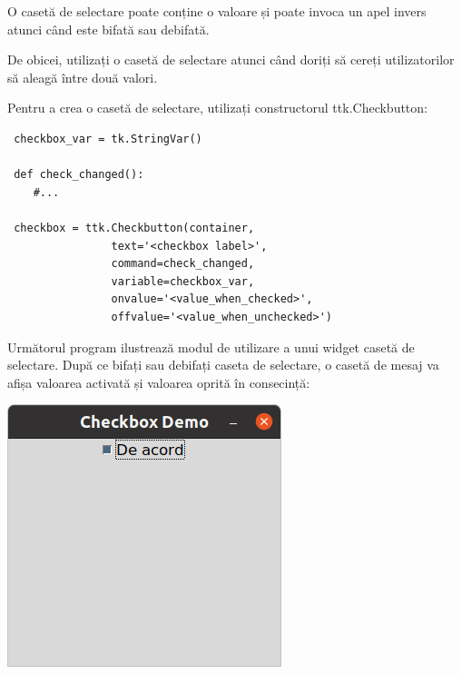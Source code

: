 \documentclass[12pt,a4paper]{book}
\begin{document}
 O casetă de selectare poate conține o valoare și poate invoca un apel invers atunci când este bifată sau debifată.

 De obicei, utilizați o casetă de selectare atunci când doriți să cereți utilizatorilor să aleagă între două valori.

 Pentru a crea o casetă de selectare, utilizați constructorul ttk.Checkbutton:
 
\begin{verbatim}
 checkbox_var = tk.StringVar()

 def check_changed():
    #...

 checkbox = ttk.Checkbutton(container,
                text='<checkbox label>',
                command=check_changed,
                variable=checkbox_var,
                onvalue='<value_when_checked>',
                offvalue='<value_when_unchecked>')
\end{verbatim}
Următorul program ilustrează modul de utilizare a unui widget casetă de selectare.  După ce bifați sau debifați caseta de selectare, o casetă de mesaj va afișa valoarea activată și valoarea oprită în consecință:

\includegraphics[width=\linewidth, scale=0.25]{img04.png}
\end{document}
